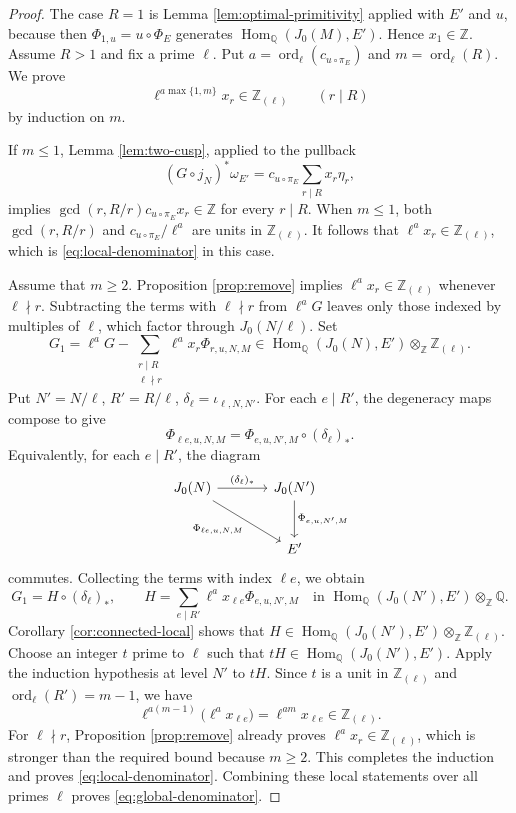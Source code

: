\documentclass[10pt,a4paper]{amsart}
\newcommand{\Hom}{\operatorname{Hom}}
\newcommand{\Q}{\mathbb Q}
\newcommand{\Z}{\mathbb Z}
\DeclareMathOperator{\ord}{ord}
\begin{document}
\begin{proof}
The case \(R=1\) is Lemma \ref{lem:optimal-primitivity} applied with
\(E'\) and \(u\), because then
\(\Phi_{1,u}=u\circ\Phi_E\) generates \(\Hom_\Q(J_0(M),E')\). Hence
\(x_1\in\Z\).
Assume \(R>1\) and fix a prime \(\ell\). Put
\(a=\ord_\ell(c_{u\circ\pi_E})\) and \(m=\ord_\ell(R)\). We prove
\begin{equation}\label{eq:local-denominator}
        \ell^{a\max\{1,m\}}x_r\in\Z_{(\ell)}
        \qquad(r\mid R)
\end{equation}
by induction on \(m\).

If \(m\le1\), Lemma \ref{lem:two-cusp}, applied to the pullback
\[
        (G\circ j_N)^*\omega_{E'}
        =
        c_{u\circ\pi_E}\sum_{r\mid R}x_r\eta_r ,
\]
implies \(\gcd(r,R/r)c_{u\circ\pi_E}x_r\in\Z\) for every \(r\mid R\). When
\(m\le1\), both \(\gcd(r,R/r)\) and
\(c_{u\circ\pi_E}/\ell^a\) are units in \(\Z_{(\ell)}\). It follows that
\(\ell^ax_r\in\Z_{(\ell)}\), which is \eqref{eq:local-denominator} in this
case.

Assume that \(m\ge2\). Proposition \ref{prop:remove} implies
\(\ell^ax_r\in\Z_{(\ell)}\) whenever \(\ell\nmid r\).
Subtracting the terms with \(\ell\nmid r\) from \(\ell^aG\)
leaves only those indexed by multiples of \(\ell\), which factor through
\(J_0(N/\ell)\). Set
\[
        G_1=
        \ell^aG-
        \sum_{\substack{r\mid R\\ \ell\nmid r}}\ell^ax_r\Phi_{r,u,N,M}
        \in\Hom_\Q(J_0(N),E')\otimes_\Z\Z_{(\ell)}.
\]
Put \(N'=N/\ell\), \(R'=R/\ell\),
\(\delta_\ell=\iota_{\ell,N,N'}\).
For each \(e\mid R'\), the degeneracy maps compose to give
\[
        \Phi_{\ell e,u,N,M}
        =
        \Phi_{e,u,N',M}\circ(\delta_\ell)_*.
\]
Equivalently, for each \(e\mid R'\), the diagram
\[
\begin{tikzcd}[column sep=large,row sep=large]
J_0(N) \arrow[r,"(\delta_\ell)_*"] \arrow[dr,swap,"\Phi_{\ell e,u,N,M}"] &
J_0(N') \arrow[d,"\Phi_{e,u,N',M}"] \\
& E'
\end{tikzcd}
\]
commutes.
Collecting the terms with index \(\ell e\), we obtain
\[
        G_1=H\circ(\delta_\ell)_*,
        \qquad
        H=\sum_{e\mid R'}\ell^ax_{\ell e}\Phi_{e,u,N',M}
        \quad\text{in }\Hom_\Q(J_0(N'),E')\otimes_\Z\Q.
\]
Corollary \ref{cor:connected-local} shows that
\(H\in\Hom_\Q(J_0(N'),E')\otimes_\Z\Z_{(\ell)}\).
Choose an integer \(t\) prime to \(\ell\) such that
\(tH\in\Hom_\Q(J_0(N'),E')\). Apply the induction hypothesis at level \(N'\)
to \(tH\). Since \(t\) is a unit in \(\Z_{(\ell)}\) and
\(\ord_\ell(R')=m-1\), we have
\[
        \ell^{a(m-1)}\bigl(\ell^ax_{\ell e}\bigr)
        =\ell^{am}x_{\ell e}\in\Z_{(\ell)}.
\]
For \(\ell\nmid r\), Proposition \ref{prop:remove} already proves
\(\ell^ax_r\in\Z_{(\ell)}\), which is stronger than the required bound because
\(m\ge2\). This completes the induction and proves
\eqref{eq:local-denominator}. Combining these local statements over all
primes \(\ell\) proves \eqref{eq:global-denominator}.
\end{proof}
\end{document}
